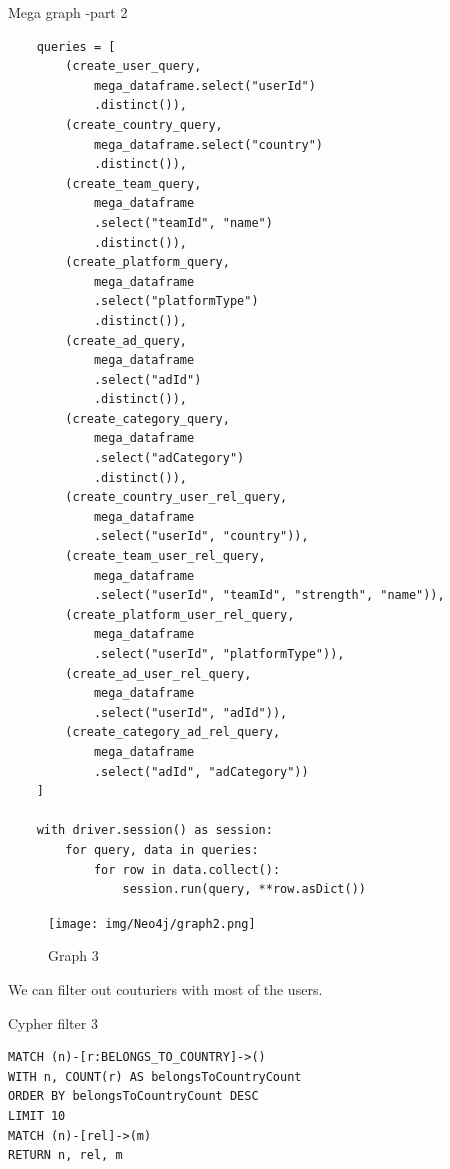 \begin{listing}[H]
\caption{Mega graph -part 2}
\begin{verbatim}
    queries = [
        (create_user_query, 
            mega_dataframe.select("userId")
            .distinct()),
        (create_country_query, 
            mega_dataframe.select("country")
            .distinct()),
        (create_team_query, 
            mega_dataframe
            .select("teamId", "name")
            .distinct()),
        (create_platform_query, 
            mega_dataframe
            .select("platformType")
            .distinct()),
        (create_ad_query, 
            mega_dataframe
            .select("adId")
            .distinct()),
        (create_category_query, 
            mega_dataframe
            .select("adCategory")
            .distinct()),
        (create_country_user_rel_query, 
            mega_dataframe
            .select("userId", "country")),
        (create_team_user_rel_query, 
            mega_dataframe
            .select("userId", "teamId", "strength", "name")),
        (create_platform_user_rel_query, 
            mega_dataframe
            .select("userId", "platformType")),
        (create_ad_user_rel_query, 
            mega_dataframe
            .select("userId", "adId")),
        (create_category_ad_rel_query, 
            mega_dataframe
            .select("adId", "adCategory"))
    ]

    with driver.session() as session:
        for query, data in queries:
            for row in data.collect():
                session.run(query, **row.asDict())
\end{verbatim}
\end{listing}

\begin{landscape}
    \begin{figure}[H]
        \texttt{[image: img/Neo4j/graph2.png]}
        \centering
        \caption{Graph 3}
        \label{fig:graph2}
    \end{figure}
\end{landscape}

We can filter out couturiers with most of the users.
\begin{listing}[H]
\caption{Cypher filter 3}
\begin{verbatim}
MATCH (n)-[r:BELONGS_TO_COUNTRY]->()
WITH n, COUNT(r) AS belongsToCountryCount
ORDER BY belongsToCountryCount DESC
LIMIT 10
MATCH (n)-[rel]->(m)
RETURN n, rel, m
\end{verbatim}
\end{listing}

